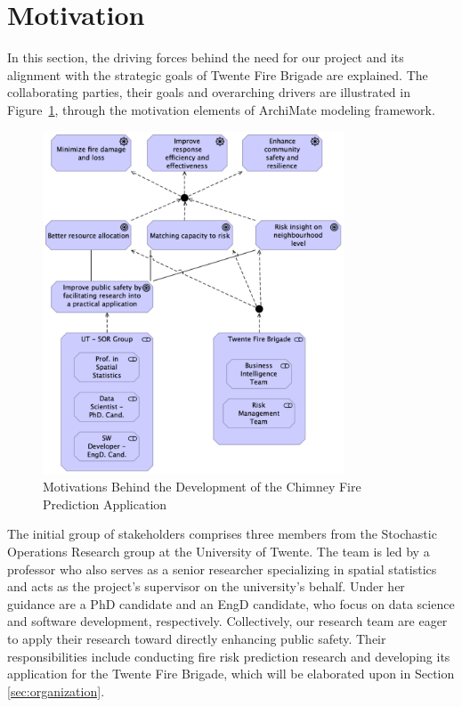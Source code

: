 \documentclass{utitcphd_overleaf}
\begin{document}
\section{Motivation}

In this section, the driving forces behind the need for our project and its alignment with the strategic goals of Twente Fire Brigade are explained. The collaborating parties, their goals and overarching drivers are illustrated in Figure~\ref{fig:motivation}, through the motivation elements of ArchiMate modeling framework.

\begin{figure}[ht]
  \centering
  \includegraphics[width=0.8\textwidth]{my_images/other/motivation.pdf}
  \caption{Motivations Behind the Development of the Chimney Fire Prediction Application}
  \label{fig:motivation}
\end{figure}

The initial group of stakeholders comprises three members from the Stochastic Operations Research group at the University of Twente. The team is led by a professor who also serves as a senior researcher specializing in spatial statistics and acts as the project's supervisor on the university's behalf. Under her guidance are a PhD candidate and an EngD candidate, who focus on data science and software development, respectively. Collectively, our research team are eager to apply their research toward directly enhancing public safety. Their responsibilities include conducting fire risk prediction research and developing its application for the Twente Fire Brigade, which will be elaborated upon in Section \ref{sec:organization}.
\end{document}
